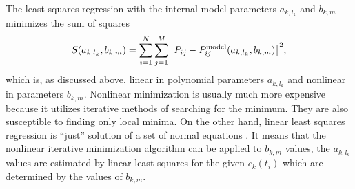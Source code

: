 The least-squares regression with the internal model parameters $a_{k,l_k}$ and
$b_{k,m}$ minimizes the sum of squares
\begin{equation}
	S(a_{k,l_k},b_{k,m}) = \sum_{i=1}^N{\sum_{j=1}^M{
		\left[P_{ij} - P_{ij}^\text{model}(a_{k,l_k},b_{k,m})\right]^2
	}},
	\label{\eqnlabel{two_comp:sos}}
\end{equation}
which is, as discussed above, linear in polynomial parameters $a_{k,l_k}$ and
nonlinear in parameters $b_{k,m}$.
Nonlinear minimization is usually much more expensive because it utilizes
iterative methods of searching for the minimum.
They are also susceptible to finding only local minima.
On the other hand, linear least squares regression is “just” solution of a set
of normal equations
\parencite[p.~671]{NumericalRecipes}.
It means that the nonlinear iterative minimization algorithm can be applied
to $b_{k,m}$ values, the $a_{k,l_k}$ values are estimated by linear least
squares for the given $c_k(t_i)$ which are determined by the values of
$b_{k,m}$.
